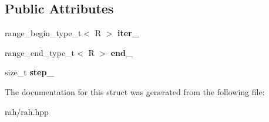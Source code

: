 \subsection*{Public Attributes}
\begin{DoxyCompactItemize}
\item 
\mbox{\label{struct_r_a_h___n_a_m_e_s_p_a_c_e_1_1view_1_1stride__iterator_a361d1587d1a44aaa7b224e220c100c9e}} 
range\+\_\+begin\+\_\+type\+\_\+t$<$ R $>$ {\bfseries iter\+\_\+}
\item 
\mbox{\label{struct_r_a_h___n_a_m_e_s_p_a_c_e_1_1view_1_1stride__iterator_a6c7ad4728a22048143949c4425438e53}} 
range\+\_\+end\+\_\+type\+\_\+t$<$ R $>$ {\bfseries end\+\_\+}
\item 
\mbox{\label{struct_r_a_h___n_a_m_e_s_p_a_c_e_1_1view_1_1stride__iterator_a66a5065ce36aca56255bd68127b9706f}} 
size\+\_\+t {\bfseries step\+\_\+}
\end{DoxyCompactItemize}


The documentation for this struct was generated from the following file\+:\begin{DoxyCompactItemize}
\item 
rah/rah.\+hpp\end{DoxyCompactItemize}
